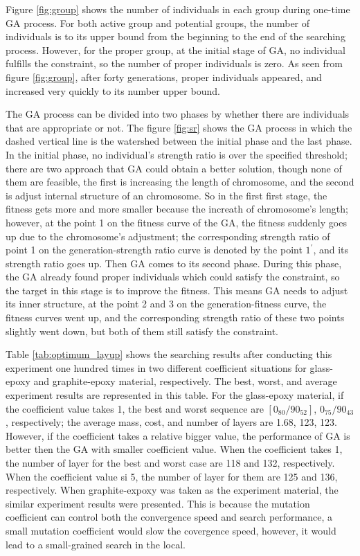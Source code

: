 Figure \ref{fig:group} shows the number of individuals in each group during
one-time GA process.  For both active group and potential groups, the number of
individuals is to its upper bound from the beginning to the end of the
searching process. However, for the proper group, at the initial stage of GA,
no individual fulfills the constraint, so the number of proper individuals is
zero. As seen from figure \ref{fig:group}, after forty generations, proper
individuals appeared, and increased very quickly to its number upper bound.


The GA process can be divided into two phases by whether there are individuals
that are appropriate or not. The figure \ref{fig:sr} shows the GA process in
which the dashed vertical line is the watershed between the initial phase and
the last phase. In the initial phase, no individual's strength ratio is over
the specified threshold; there are two approach that GA could obtain a better
solution, though none of them are feasible, the first is increasing the length
of chromosome, and the second is adjust internal structure of an chromosome. So
in the first first stage, the fitness gets more and more smaller because the
increath of chromosome's length; however, at the point 1 on the fitness curve
of the GA, the fitness suddenly goes up due to the chromosome's adjustment; the
corresponding strength ratio of point 1 on the generation-strength ratio curve
is denoted by the point $1^{\prime}$, and its strength ratio goes up.  Then GA
comes to its second phase. During this phase, the GA already found proper
individuals which could satisfy the constraint, so the target in this stage is
to improve the fitness. This means GA needs to adjust its inner structure, at
the point 2 and 3 on the generation-fitness curve, the fitness curves went up,
and the corresponding strength ratio of these two points slightly went down,
but both of them still satisfy the constraint.



Table \ref{tab:optimum_layup} shows the searching results after conducting this
experiment one hundred times in two different coefficient situations for
glass-epoxy and graphite-epoxy material, respectively. The best, worst, and
average experiment results are represented in this table. For the glass-epoxy
material, if the coefficient value takes 1, the best and worst sequence are
$[0_{80}/90_{52}]$, $0_{75}/90_{43}$, respectively; the average mass, cost, and
number of layers are 1.68, 123, 123. However, if the coefficient takes a
relative bigger value, the performance of GA is better then the GA with smaller
coefficient value. When the coefficient takes 1, the number of layer for the
best and worst case are 118 and 132, respectively. When the coefficient value
si 5, the number of layer for them are 125 and 136, respectively. When
graphite-expoxy was taken as the experiment material, the similar experiment
results were presented. This is because the mutation coefficient can control
both the convergence speed and search performance, a small mutation coefficient
would slow the covergence speed, however, it would lead to a small-grained
search in the local. 



